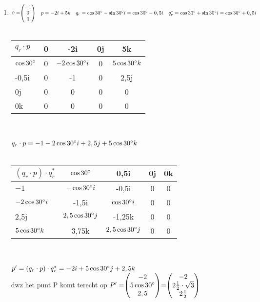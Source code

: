 \begin{enumerate}
	\item
	$\hat{v} = \vecdrie{-1}{0}{0} \quad p = -2i +5k   \\
	\quad q_r = \cos 30 \degree -\sin 30 \degree i  =  \cos 30 \degree - 0,5i \\
	\quad q^*_r =  \cos 30 \degree + \sin 30 \degree i  =  \cos 30 \degree + 0,5i $ \\ \\
	\begin{tabular}{ | l || c | c |c |c |}
		\hline
		$ q_r\cdot p $ & 0 & -2i   & 0j & 5k \\ \hline \hline
		$\cos 30 \degree   $  & 0 &  $-2\cos 30 \degree i  $
		&   0    &  $5\cos 30 \degree k  $ \\ \hline
		-0,5i   & 0 &  -1  &   0       & 2,5j  \\ \hline
		0j   & 0 &  0 &   0    & 0\\ \hline
		0k    & 0  & 0   & 0  & 0\\ 
		\hline 
	\end{tabular} \\ \\
	$ q_r\cdot p = -1 -2\cos 30 \degree i  + 2,5j + 5\cos 30 \degree k $\\ \\
	\begin{tabular}{ | l || c | c |c |c |}
		\hline
		$ (q_r\cdot p)\cdot q^*_r $ & $ \cos 30 \degree  $ & 0,5i   & 0j & 0k \\ \hline \hline
		$-1   $   &  $-\cos 30 \degree i  $ & -0,5i	&   0    &  0 \\ \hline
		$ -2\cos 30 \degree i  $ & -1,5i &  $ \cos 30 \degree i  $  &0&0\\ \hline
		2,5j   & $ 2,5\cos 30 \degree j  $ &  -1,25k &   0    & 0\\ \hline
		$ 5\cos 30 \degree k  $    & 3,75k  & $ 2,5\cos 30 \degree j  $    & 0  & 0\\ 
		\hline 
	\end{tabular} \\ \\
	$ p' = (q_r\cdot p)\cdot q^*_r = -2i + 5\cos 30 \degree j  + 2,5k $\\
	dwz het punt P komt terecht op $ P' = \vecdrie{-2}{5\cos 30 \degree}{2,5}
	= \vecdrie{-2}{2\frac{1}{2}\cdot \sqrt{3}}{2\frac{1}{2}} $
	
	
	
\end{enumerate}

